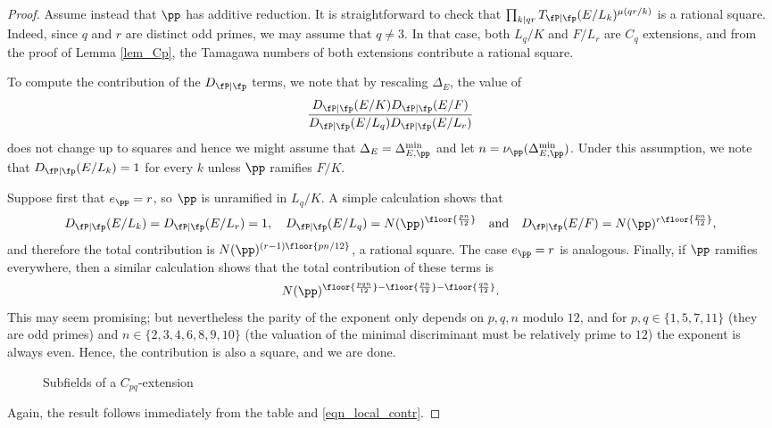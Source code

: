 \begin{proof}
    Assume instead that $\pp$ has additive reduction. It is straightforward to check that $\prod_{k\mid qr}T_{\fP\mid\fp}(E/L_k)^{\mu(qr/k)}$ is a rational square. Indeed, since $q$ and $r$ are distinct odd primes, we may assume that $q\neq 3$. In that case, both $L_q/K$ and $F/L_r$ are $C_q$ extensions, and from the proof of Lemma \ref*{lem_Cp}, the Tamagawa numbers of both extensions contribute a rational square.
    
    To compute the contribution of the $D_{\fP\mid\fp}$ terms, we note that by rescaling $\Delta_E$, the value of 
    $$\frac{D_{\fP\mid\fp}(E/K)D_{\fP\mid\fp}(E/F)}{D_{\fP\mid\fp}(E/L_q)D_{\fP\mid\fp}(E/L_r)}$$
    does not change up to squares and hence we might assume that $\Delta_E=\Delta_{E,\pp}^{\min}$ and let $n=\nu_\pp(\Delta_{E,\pp}^{\min})$. Under this assumption, we note that $D_{\fP\mid\fp}(E/L_k)=1$ for every $k$ unless $\pp$ ramifies $F/K$. 
    
    Suppose first that $e_\pp=r$, so $\pp$ is unramified in $L_q/K$. A simple calculation shows that 
    $$D_{\fP\mid\fp}(E/L_k)=D_{\fP\mid\fp}(E/L_r)=1,\quad D_{\fP\mid\fp}(E/L_q)=N(\pp)^{\floor{\frac{pn}{12}}}\quad\text{and}\quad D_{\fP\mid\fp}(E/F)=N(\pp)^{r\floor{\frac{pn}{12}}},$$
    and therefore the total contribution is $N(\pp)^{(r-1)\floor{pn/12}}$, a rational square. The case $e_\pp=r$ is analogous. Finally, if $\pp$ ramifies everywhere, then a similar calculation shows that the total contribution of these terms is 
    $$N(\pp)^{\floor{\frac{pqn}{12}}-\floor{\frac{pn}{12}}-\floor{\frac{qn}{12}}}.$$
    This may seem promising; but nevertheless the parity of the exponent only depends on $p,q,n$ modulo $12$, and for $p,q\in\{1,5,7,11\}$ (they are odd primes) and $n\in\{2,3,4,6,8,9,10\}$ (the valuation of the minimal discriminant must be relatively prime to $12$) the exponent is always even. Hence, the contribution is also a square, and we are done. 

    \begin{figure}[!ht]
        \centering
        \caption[short]{Subfields of a $C_{pq}$-extension}
    \end{figure}

    Again, the result follows immediately from the table and \eqref{eqn_local_contr}.
    
\end{proof}

